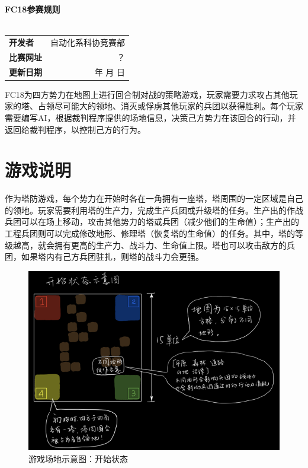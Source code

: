 \documentclass[a4paper,4pt]{article}
\renewcommand{\today}{\number\year 年 \number\month 月 \number\day 日}
\begin{document}
\begin{titlepage}
	\heiti
	\vspace*{64pt}
	\begin{center}
		\fontsize{43pt}{0} \textbf{FC18参赛规则}\\
		\vspace*{36pt}
		\\
		\vspace*{280pt}
		\Large
		\rmfamily
		\begin{tabular}{lr} %
			\textbf{开发者}   & 自动化系科协竞赛部 \\
			\textbf{比赛网址} & ？                 \\
			\textbf{更新日期} & \today             \\
		\end{tabular}
	\end{center}
\end{titlepage}


\tableofcontents%
\newpage%

FC18为四方势力在地图上进行回合制对战的策略游戏，玩家需要力求攻占其他玩家的塔、占领尽可能大的领地、消灭或俘虏其他玩家的兵团以获得胜利。每个玩家需要编写AI，根据裁判程序提供的场地信息，决策己方势力在该回合的行动，并返回给裁判程序，以控制己方的行为。
\section{游戏说明}
作为塔防游戏，每个势力在开始时各在一角拥有一座塔，塔周围的一定区域是自己的领地。玩家需要利用塔的生产力，完成生产兵团或升级塔的任务。生产出的作战兵团可以在场上移动，攻击其他势力的塔或兵团（减少他们的生命值）；生产出的工程兵团则可以完成修改地形、修理塔（恢复塔的生命值）的任务。其中，塔的等级越高，就会拥有更高的生产力、战斗力、生命值上限。塔也可以攻击敌方的兵团，如果塔内有己方兵团驻扎，则塔的战斗力会更强。

\begin{figure}[htbp]   %
	\centering
	\includegraphics[width=5.5 in]{01开始.jpg}
	\caption{游戏场地示意图：开始状态}
	\label{jpg:示例图片1}
\end{figure}
\end{document}
